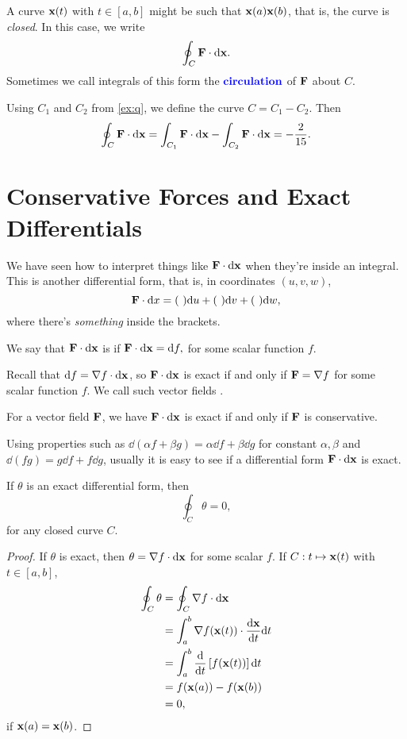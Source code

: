 \documentclass[a4paper]{scrreprt}
\begin{document}
A curve $\mathbf{x}(t)$ with $t \in [a, b]$ might be such that $\mathbf{x}(a) \mathbf{x}(b)$, that is, the curve is \emph{closed}. In this case, we write
$$
\oint_C \mathbf{F} \cdot \mathrm{d} \mathbf{x}.
$$
Sometimes we call integrals of this form the $\textbf{\color{blue} circulation}$ of $\mathbf{F}$ about $C$.

\begin{example}
	Using $C_1$ and $C_2$ from \autoref{ex:q}, we define the curve $C = C_1 - C_2$. Then
	$$
		\oint_C \mathbf{F} \cdot \mathrm{d} \mathbf{x} = \int_{C_1} \mathbf{F} \cdot \mathrm{d} \mathbf{x} - \int_{C_2} \mathbf{F} \cdot \mathrm{d} \mathbf{x} = - \frac{2}{15}.
	$$
\end{example}

\section{Conservative Forces and Exact Differentials}

We have seen how to interpret things like $\mathbf{F} \cdot \mathrm{d} \mathbf{x}$ when they're inside an integral. This is another differential form, that is, in coordinates $(u, v, w)$,
$$
\mathbf{F} \cdot \mathrm{d} x = (\ )\mathrm{d} u + (\ ) \mathrm{d} v + (\ ) \mathrm{d} w,
$$
where there's \emph{something} inside the brackets.

\begin{definition}[Exactness]
	We say that $\mathbf{F} \cdot\mathrm{d} \mathbf{x}$ is  if
	$
	\mathbf{F} \cdot \mathrm{d} \mathbf{x} = \mathrm{d} f,
	$
	for some scalar function $f$.
\end{definition}

Recall that $\mathrm{d} f = \nabla f \cdot \mathrm{d} \mathbf{x}$, so $\mathbf{F} \cdot \mathrm{d} \mathbf{x}$ is exact if and only if $\mathbf{F} = \nabla f$ for some scalar function $f$. We call such vector fields .


For a vector field $\mathbf{F}$, we have $\mathbf{F} \cdot \mathrm{d} \mathbf{x}$ is exact if and only if $\mathbf{F}$ is conservative.

Using properties such as $\dd(\alpha f + \beta g) = \alpha \dd f + \beta \dd g$ for constant $\alpha, \beta$ and $\dd(fg) = g \dd f + f \dd g$, usually it is easy to see if a differential form $\mathbf{F} \cdot \mathrm{d} \mathbf{x}$ is exact.

\begin{proposition}
	If $\theta$ is an exact differential form, then
	$$
	\oint_C \theta = 0,
	$$
	for any closed curve $C$.
\end{proposition}
\begin{proof}
	If $\theta$ is exact, then $\theta = \nabla f \cdot \mathrm{d} \mathbf{x}$ for some scalar $f$. If $C: t \mapsto \mathbf{x}(t)$ with $t \in [a, b]$,
	\begin{align*}
		\oint_C \theta &= \oint_C \nabla f \cdot \mathrm{d} \mathbf{x} \\
			&= \int_{a}^b \nabla f(\mathbf{x}(t)) \cdot \frac{\mathrm{d} \mathbf{x}}{\mathrm{d} t} \mathrm{d} t \\
			&= \int_a^b \frac{\mathrm{d}}{\mathrm{d} t} \left[f(\mathbf{x}(t))\right] \mathrm{d} t \\
			&= f(\mathbf{x}(a)) - f(\mathbf{x}(b))\\
			&= 0,
	\end{align*}
	if $\mathbf{x}(a) = \mathbf{x}(b)$.
\end{proof}
\end{document}
